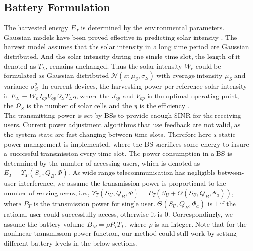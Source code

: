 \documentclass[conference]{IEEEtran}
\begin{document}
\subsection{Battery Formulation}
The harvested energy \(E_T\) is determined by the environmental parameters.
Gaussian models have been proved effective in predicting solar intensity \cite{gaussian,data}.
The harvest model assumes that the solar intensity in a long time period are Gaussian distributed.
And the solar intensity during one single time slot, the length of it denoted as \(T_L\), remains unchanged.
Thus the solar intensity \(W_e\) could be formulated as
Gaussian distributed \(\mathcal{N}\left(x;\mu_S,\sigma_S\right)\)
with average intensity \(\mu_S\) and variance \(\sigma_S^2\).
In current devices,
the harvesting power per reference solar intensity is
\(E_H = W_eJ_{op}V_{op}\Omega_ST_L\eta\), where the \(J_{op}\) and \(V_{op}\) is the optimal operating point,
the \(\Omega_S\) is the number of solar cells and the \(\eta\) is the efficiency \cite{physic}.\\
\indent The transmitting power is set by BSs to provide enough SINR for the receiving users.
Current power adjustment algorithms that use feedback are not valid,
as the system state are fast changing between time slots.
Therefore here a static power management is implemented,
where the BS sacrifices some energy to insure a successful transmission every time slot.
The power consumption in a BS is determined by the number of accessing users,
which is denoted as \(E_T = \Upsilon_T(S_U, Q_B, \Phi)\).
As wide range telecommunication has negligible between-user interference,
we assume the transmission power is proportional to the number of serving users, i.e.,
\(\Upsilon_T(S_U, Q_B, \Phi) = P_T(S_U + \Theta(S_U,Q_B,\Phi_a))\), where \(P_T\) is the transmission power for single user.
\(\Theta(S_U,Q_B,\Phi_a)\) is \(1\) if the rational user could successfully access, otherwise it is \(0\).
Correspondingly, we assume the battery volume \(B_M = \rho P_TT_L\), where \(\rho\) is an integer.
Note that for the nonlinear transmission power function,
our method could still work by setting different battery levels in the below sections.
\end{document}
